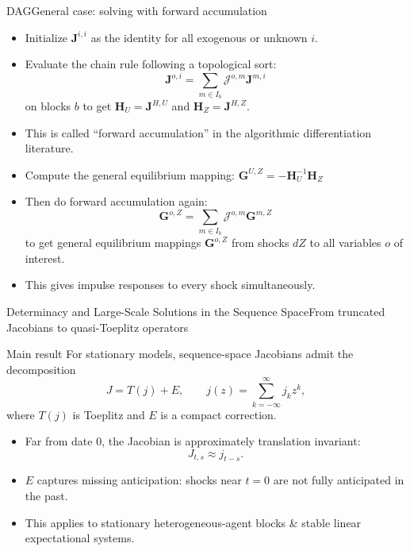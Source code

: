\documentclass[aspectratio=169]{beamer}
\begin{document}
\begin{frame}{DAG}{General case: solving with forward accumulation}
    \begin{itemize}
        \item Initialize $\mathbf{J}^{i,i}$ as the identity for all exogenous or unknown $i$.
        \item Evaluate the chain rule following a topological sort:
              \[
                  \mathbf{J}^{o,i} = \sum_{m \in I_b} \mathcal{J}^{o,m} \mathbf{J}^{m,i}
              \]
              on blocks $b$ to get $\mathbf{H}_U = \mathbf{J}^{H,U}$ and $\mathbf{H}_Z = \mathbf{J}^{H,Z}$.
        \item This is called ``forward accumulation'' in the algorithmic differentiation literature.
        \item Compute the general equilibrium mapping:
              \(
              \mathbf{G}^{U,Z} = -\mathbf{H}_U^{-1} \mathbf{H}_Z
              \)
        \item Then do forward accumulation again:
              \[
                  \mathbf{G}^{o,Z} = \sum_{m \in I_b} \mathcal{J}^{o,m} \mathbf{G}^{m,Z}
              \]
              to get general equilibrium mappings $\mathbf{G}^{o,Z}$ from shocks $dZ$ to all variables $o$ of interest.
        \item This gives impulse responses to every shock simultaneously.
    \end{itemize}
\end{frame}



\begin{frame}{Determinacy and Large-Scale Solutions in the Sequence Space}{From truncated Jacobians to quasi-Toeplitz operators}
\small
\begin{block}{Main result}
For stationary models, sequence-space Jacobians admit the decomposition
\[
J = T(j) + E,
\qquad
j(z)=\sum_{k=-\infty}^{\infty} j_k z^k,
\]
where $T(j)$ is Toeplitz and $E$ is a compact correction.
\end{block}

\begin{itemize}
    \item Far from date $0$, the Jacobian is approximately translation invariant:
    \[
    J_{t,s}\approx j_{t-s}.
    \]
    \item $E$ captures \alert{missing anticipation}: shocks near $t=0$ are not fully anticipated in the past.
    \item This applies to stationary heterogeneous-agent blocks \& stable linear expectational systems.
\end{itemize}

\end{frame}
\end{document}
